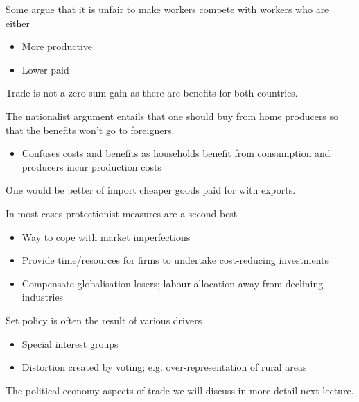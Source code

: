 \documentclass{beamer}
\begin{document}
\begin{frame}
 Some argue that it is unfair to make workers compete with workers who are either
 \begin{itemize}
   \item More productive
   \item Lower paid
 \end{itemize}
 \medskip
 Trade is not a zero-sum gain as there are benefits for both countries. 
\end{frame}

\begin{frame}
  The nationalist argument entails that one should buy from home producers so that the benefits won't go to foreigners.
  \begin{itemize}
    \item Confuses costs and benefits as households benefit from consumption and producers incur production costs
  \end{itemize}
  \medskip
  One would be better of import cheaper goods paid for with exports. 
\end{frame}

\begin{frame}  
  In most cases protectionist measures are a second best
  \begin{itemize}
    \item Way to cope with market imperfections
    \item Provide time/resources for firms to undertake cost-reducing investments
    \item Compensate globalisation losers; labour allocation away from declining industries
  \end{itemize}
\end{frame}

\begin{frame}
  Set policy is often the result of various drivers
  \begin{itemize}
    \item Special interest groups
    \item Distortion created by voting; e.g. over-representation of rural areas    
  \end{itemize}
  \medskip
  The political economy aspects of trade we will discuss in more detail next lecture.  
\end{frame}
\end{document}
